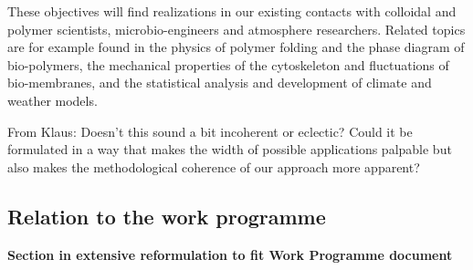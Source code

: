 These objectives will find realizations in our existing contacts with colloidal and polymer scientists,
microbio-engineers and atmosphere researchers. Related topics are for example found in the
physics of polymer folding and the phase diagram of bio-polymers, the mechanical properties
of the cytoskeleton and fluctuations of bio-membranes, and the statistical analysis and
development of climate and weather models.

\begin{draft}
  From Klaus: Doesn't this sound a bit incoherent or eclectic? Could it be formulated in a
  way that makes the width of possible applications palpable but also makes the
  methodological coherence of our approach more apparent?
\end{draft}

\subsection{Relation to the work programme}\label{sec:relation-wp}

{\bf Section in extensive reformulation to fit Work Programme document}

